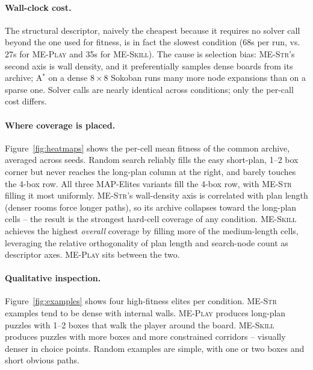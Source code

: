 \paragraph{Wall-clock cost.} The structural descriptor, naively the cheapest because it requires no solver call beyond the one used for fitness, is in fact the slowest condition (68s per run, vs. 27s for \textsc{ME-Play} and 35s for \textsc{ME-Skill}). The cause is selection bias: \textsc{ME-Str}'s second axis is wall density, and it preferentially samples dense boards from its archive; A$^*$ on a dense $8\times 8$ Sokoban runs many more node expansions than on a sparse one. Solver calls are nearly identical across conditions; only the per-call cost differs.
\paragraph{Where coverage is placed.} Figure~\ref{fig:heatmaps} shows the per-cell mean fitness of the common archive, averaged across seeds. Random search reliably fills the easy short-plan, 1--2 box corner but never reaches the long-plan column at the right, and barely touches the 4-box row. All three MAP-Elites variants fill the 4-box row, with \textsc{ME-Str} filling it most uniformly. \textsc{ME-Str}'s wall-density axis is correlated with plan length (denser rooms force longer paths), so its archive collapses toward the long-plan cells -- the result is the strongest hard-cell coverage of any condition. \textsc{ME-Skill} achieves the highest \emph{overall} coverage by filling more of the medium-length cells, leveraging the relative orthogonality of plan length and search-node count as descriptor axes. \textsc{ME-Play} sits between the two.
\paragraph{Qualitative inspection.} Figure~\ref{fig:examples} shows four high-fitness elites per condition. \textsc{ME-Str} examples tend to be dense with internal walls. \textsc{ME-Play} produces long-plan puzzles with 1--2 boxes that walk the player around the board. \textsc{ME-Skill} produces puzzles with more boxes and more constrained corridors -- visually denser in choice points. Random examples are simple, with one or two boxes and short obvious paths.